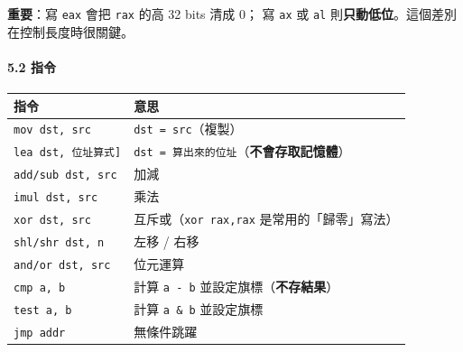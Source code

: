\documentclass[10pt,a4paper]{article}
\newcounter{none}
\begin{document}
\textbf{重要}：寫 \texttt{eax} 會把 \texttt{rax} 的高 32 bits 清成 0；
寫 \texttt{ax} 或 \texttt{al}
則\textbf{只動低位}。這個差別在控制長度時很關鍵。

\paragraph{5.2 指令}\label{ux6307ux4ee4}

{\def\LTcaptype{none} %
\begin{longtable}[]{@{}
  >{\raggedright\arraybackslash}p{}
  >{\raggedright\arraybackslash}p{}@{}}
\toprule\noalign{}
\begin{minipage}[b]{\linewidth}\raggedright
指令
\end{minipage} & \begin{minipage}[b]{\linewidth}\raggedright
意思
\end{minipage} \\
\midrule\noalign{}
\endhead
\bottomrule\noalign{}
\endlastfoot
\texttt{mov\ \allowbreak{}dst,\allowbreak{}\ \allowbreak{}src} & \texttt{dst\ \allowbreak{}=\ \allowbreak{}src}（複製） \\
\texttt{lea\ \allowbreak{}dst,\allowbreak{}\ \allowbreak{}{[}位址算式{]}} &
\texttt{dst\ \allowbreak{}=\ \allowbreak{}算出來的位址}（\textbf{不會存取記憶體}） \\
\texttt{add/\allowbreak{}sub\ \allowbreak{}dst,\allowbreak{}\ \allowbreak{}src} & 加減 \\
\texttt{imul\ \allowbreak{}dst,\allowbreak{}\ \allowbreak{}src} & 乘法 \\
\texttt{xor\ \allowbreak{}dst,\allowbreak{}\ \allowbreak{}src} & 互斥或（\texttt{xor\ \allowbreak{}rax,\allowbreak{}rax}
是常用的「歸零」寫法） \\
\texttt{shl/\allowbreak{}shr\ \allowbreak{}dst,\allowbreak{}\ \allowbreak{}n} & 左移 / 右移 \\
\texttt{and/\allowbreak{}or\ \allowbreak{}dst,\allowbreak{}\ \allowbreak{}src} & 位元運算 \\
\texttt{cmp\ \allowbreak{}a,\allowbreak{}\ \allowbreak{}b} & 計算 \texttt{a\ \allowbreak{}-\allowbreak{}\ \allowbreak{}b}
並設定旗標（\textbf{不存結果}） \\
\texttt{test\ \allowbreak{}a,\allowbreak{}\ \allowbreak{}b} & 計算 \texttt{a\ \allowbreak{}\&\allowbreak{}\ \allowbreak{}b} 並設定旗標 \\
\texttt{jmp\ \allowbreak{}addr} & 無條件跳躍 \\

\end{longtable}}
\end{document}

